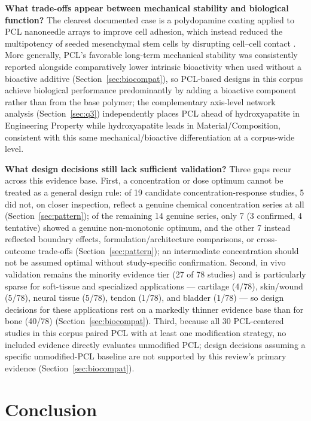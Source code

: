 \documentclass[5p,times,twocolumn]{elsarticle}
\begin{document}
\textbf{What trade-offs appear between mechanical stability and biological function?} The clearest documented case is a polydopamine coating applied to PCL nanoneedle arrays to improve cell adhesion, which instead reduced the multipotency of seeded mesenchymal stem cells by disrupting cell--cell contact \cite{ref60}. More generally, PCL's favorable long-term mechanical stability was consistently reported alongside comparatively lower intrinsic bioactivity when used without a bioactive additive (Section~\ref{sec:biocompat}), so PCL-based designs in this corpus achieve biological performance predominantly by adding a bioactive component rather than from the base polymer; the complementary axis-level network analysis (Section~\ref{sec:q3}) independently places PCL ahead of hydroxyapatite in Engineering Property while hydroxyapatite leads in Material/Composition, consistent with this same mechanical/bioactive differentiation at a corpus-wide level.

\textbf{What design decisions still lack sufficient validation?} Three gaps recur across this evidence base. First, a concentration or dose optimum cannot be treated as a general design rule: of 19 candidate concentration-response studies, 5 did not, on closer inspection, reflect a genuine chemical concentration series at all (Section~\ref{sec:pattern}); of the remaining 14 genuine series, only 7 (3 confirmed, 4 tentative) showed a genuine non-monotonic optimum, and the other 7 instead reflected boundary effects, formulation/architecture comparisons, or cross-outcome trade-offs (Section~\ref{sec:pattern}); an intermediate concentration should not be assumed optimal without study-specific confirmation. Second, in vivo validation remains the minority evidence tier (27 of 78 studies) and is particularly sparse for soft-tissue and specialized applications --- cartilage (4/78), skin/wound (5/78), neural tissue (5/78), tendon (1/78), and bladder (1/78) --- so design decisions for these applications rest on a markedly thinner evidence base than for bone (40/78) (Section~\ref{sec:biocompat}). Third, because all 30 PCL-centered studies in this corpus paired PCL with at least one modification strategy, no included evidence directly evaluates unmodified PCL; design decisions assuming a specific unmodified-PCL baseline are not supported by this review's primary evidence (Section~\ref{sec:biocompat}).

\section{Conclusion}
\end{document}
